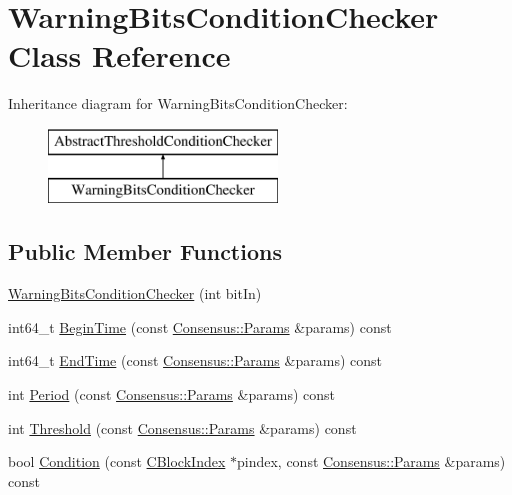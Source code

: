 \hypertarget{class_warning_bits_condition_checker}{}\section{Warning\+Bits\+Condition\+Checker Class Reference}
\label{class_warning_bits_condition_checker}
Inheritance diagram for Warning\+Bits\+Condition\+Checker\+:\begin{figure}[H]
\begin{center}
\leavevmode
\includegraphics[height=2.000000cm]{class_warning_bits_condition_checker}
\end{center}
\end{figure}
\subsection*{Public Member Functions}
\begin{DoxyCompactItemize}
\item 
\mbox{\hyperlink{class_warning_bits_condition_checker_a69026dee13dfeedbaeff0f3a6997fc10}{Warning\+Bits\+Condition\+Checker}} (int bit\+In)
\item 
int64\+\_\+t \mbox{\hyperlink{class_warning_bits_condition_checker_ab0aff380fa3d04ad540ce178792dad53}{Begin\+Time}} (const \mbox{\hyperlink{chainparams_8h_a5e1ca1b35c3dd1a4e20f18445f28dd9c}{Consensus\+::\+Params}} \&params) const
\item 
int64\+\_\+t \mbox{\hyperlink{class_warning_bits_condition_checker_ace6c66438992ea0f798806f39eca83a7}{End\+Time}} (const \mbox{\hyperlink{chainparams_8h_a5e1ca1b35c3dd1a4e20f18445f28dd9c}{Consensus\+::\+Params}} \&params) const
\item 
int \mbox{\hyperlink{class_warning_bits_condition_checker_af6dd78109426020b259b70c07bc858d7}{Period}} (const \mbox{\hyperlink{chainparams_8h_a5e1ca1b35c3dd1a4e20f18445f28dd9c}{Consensus\+::\+Params}} \&params) const
\item 
int \mbox{\hyperlink{class_warning_bits_condition_checker_af2de7b32547b0677594b1bfbdacd19ad}{Threshold}} (const \mbox{\hyperlink{chainparams_8h_a5e1ca1b35c3dd1a4e20f18445f28dd9c}{Consensus\+::\+Params}} \&params) const
\item 
bool \mbox{\hyperlink{class_warning_bits_condition_checker_aae2fc419d193b147e8fad8121fb5e579}{Condition}} (const \mbox{\hyperlink{class_c_block_index}{C\+Block\+Index}} $\ast$pindex, const \mbox{\hyperlink{chainparams_8h_a5e1ca1b35c3dd1a4e20f18445f28dd9c}{Consensus\+::\+Params}} \&params) const
\end{DoxyCompactItemize}
